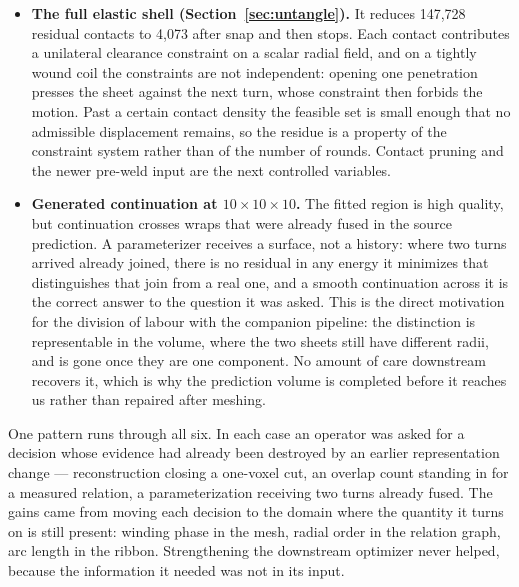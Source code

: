\begin{itemize}
  \item \textbf{The full elastic shell (Section~\ref{sec:untangle}).} It reduces 147,728 residual contacts to 4,073 after snap and then stops. Each contact contributes a unilateral clearance constraint on a scalar radial field, and on a tightly wound coil the constraints are not independent: opening one penetration presses the sheet against the next turn, whose constraint then forbids the motion. Past a certain contact density the feasible set is small enough that no admissible displacement remains, so the residue is a property of the constraint system rather than of the number of rounds. Contact pruning and the newer pre-weld input are the next controlled variables.

  \item \textbf{Generated continuation at $10\times10\times10$.} The fitted region is high quality, but continuation crosses wraps that were already fused in the source prediction. A parameterizer receives a surface, not a history: where two turns arrived already joined, there is no residual in any energy it minimizes that distinguishes that join from a real one, and a smooth continuation across it is the correct answer to the question it was asked. This is the direct motivation for the division of labour with the companion pipeline: the distinction is representable in the volume, where the two sheets still have different radii, and is gone once they are one component. No amount of care downstream recovers it, which is why the prediction volume is completed before it reaches us rather than repaired after meshing.
\end{itemize}

One pattern runs through all six. In each case an operator was asked for a decision whose evidence had already been destroyed by an earlier representation change --- reconstruction closing a one-voxel cut, an overlap count standing in for a measured relation, a parameterization receiving two turns already fused. The gains came from moving each decision to the domain where the quantity it turns on is still present: winding phase in the mesh, radial order in the relation graph, arc length in the ribbon. Strengthening the downstream optimizer never helped, because the information it needed was not in its input.

